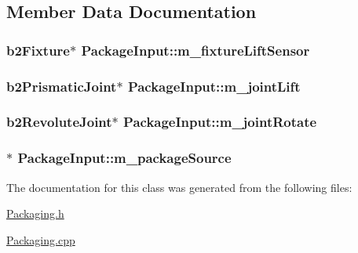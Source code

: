 \subsection{Member Data Documentation}
\hypertarget{classPackageInput_a399f8a43d5e938af2dfbcb2c7362af11}{
\subsubsection[{m\-\_\-fixture\-Lift\-Sensor}]{\setlength{\rightskip}{0pt plus 5cm}b2\-Fixture$\ast$ Package\-Input\-::m\-\_\-fixture\-Lift\-Sensor}}\label{classPackageInput_a399f8a43d5e938af2dfbcb2c7362af11}
\hypertarget{classPackageInput_a3a7aa8124e8800eb96018a358f5fb50c}{
\subsubsection[{m\-\_\-joint\-Lift}]{\setlength{\rightskip}{0pt plus 5cm}b2\-Prismatic\-Joint$\ast$ Package\-Input\-::m\-\_\-joint\-Lift}}\label{classPackageInput_a3a7aa8124e8800eb96018a358f5fb50c}
\hypertarget{classPackageInput_ad902718752425e44f187926dcbaa69dd}{
\subsubsection[{m\-\_\-joint\-Rotate}]{\setlength{\rightskip}{0pt plus 5cm}b2\-Revolute\-Joint$\ast$ Package\-Input\-::m\-\_\-joint\-Rotate}}\label{classPackageInput_ad902718752425e44f187926dcbaa69dd}
\hypertarget{classPackageInput_a6d6fb6ba9ae2f514a418be6f136907d0}{
\subsubsection[{m\-\_\-package\-Source}]{$\ast$ Package\-Input\-::m\-\_\-package\-Source}}\label{classPackageInput_a6d6fb6ba9ae2f514a418be6f136907d0}


The documentation for this class was generated from the following files\-:\begin{DoxyCompactItemize}
\item 
\hyperlink{Packaging_8h}{Packaging.\-h}\item 
\hyperlink{Packaging_8cpp}{Packaging.\-cpp}\end{DoxyCompactItemize}
